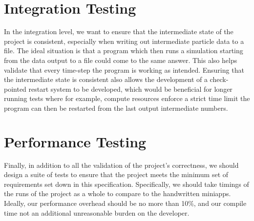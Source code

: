 \section{Integration Testing}
In the integration level, we want to ensure that the intermediate state of the project is consistent, especially when writing out intermediate particle data to a file. The ideal situation is that a program which then runs a simulation starting from the data output to a file could come to the same answer. This also helps validate that every time-step the program is working as intended. Ensuring that the intermediate state is consistent also allows the development of a check-pointed restart system to be developed, which would be beneficial for longer running tests where for example, compute resources enforce a strict time limit the program can then be restarted from the last output intermediate numbers.

\section{Performance Testing}
Finally, in addition to all the validation of the project's correctness, we should design a suite of tests to ensure that the project meets the minimum set of requirements set down in this specification. Specifically, we should take timings of the runs of the project as a whole to compare to the handwritten miniapps. Ideally, our performance overhead should be no more than 10\%, and our compile time not an additional unreasonable burden on the developer. 


